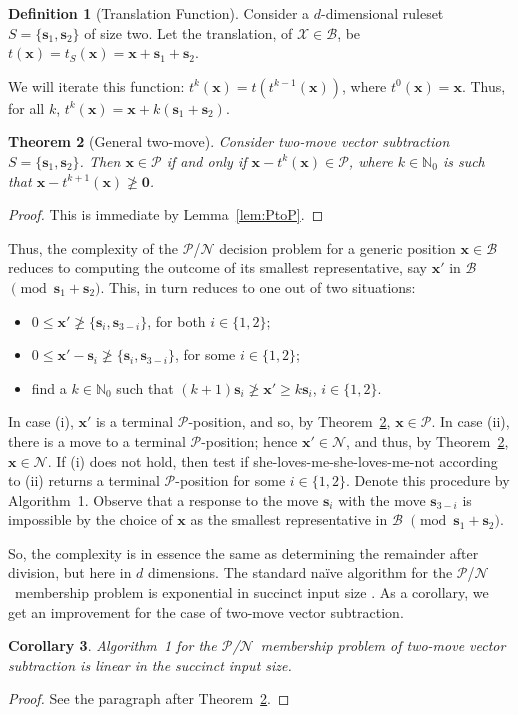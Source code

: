 \documentclass{amsart}
\theoremstyle{plain}
\newtheorem{thm}{Theorem}%
\newtheorem{cor}[thm]{Corollary}
\theoremstyle{definition}
\newtheorem{defi}[thm]{Definition}
\newcommand{\N}{\ensuremath{\mathcal N}}
\renewcommand{\P}{\ensuremath{\mathcal P}}
\newcommand{\B}{\mathcal B}
\newcommand{\X}{\mathcal X}
\newcommand{\nz}{\mathbb N_0}
\newcommand{\x}{\boldsymbol x}
\newcommand{\s}{\boldsymbol s}
\renewcommand{\ge}{\geqslant}
\renewcommand{\le}{\leqslant}
\renewcommand{\ngeq}{\ngeqslant}
\newcommand{\ur}[1]{\textcolor{red}{#1}}
\newcommand{\In}[1]{\textcolor{blue}{#1}}
\begin{document}
\begin{defi}[Translation Function]\label{def:trans}
    Consider a $d$-dimensional ruleset $S=\{\s_1 ,\s_2\}$ of size two. %
    Let the translation, of $\X\in \B$, be 
    $t(\x)=t_S(\x)=\x +\s_1+\s_2$.
\end{defi}
We will iterate this function: $t^k(\x)=t(t^{k-1}(\x))$, where $t^0(\x)=\x$. Thus, for all $k$, $t^k(\x) = \x +k(\s_1+\s_2)$. 
\begin{thm}[General {\sc two-move}]\label{thm:2mddim}
    Consider {\sc two-move vector subtraction} $S=\{\s_1,\s_2\}$. 
    Then $\x\in\P$ if and only if $\x-t^k(\x)\in\P$, where $k \in\nz$  is such that $\x-t^{k+1}(\x)\ngeq\boldsymbol 0$.
    
\end{thm}
\begin{proof}
This is immediate by Lemma~\ref{lem:PtoP}.
\end{proof}
Thus, the complexity of the $\P$/$\N$ decision problem for a generic position $\x\in\B$ reduces to computing the outcome of its smallest  representative, say $\x'$ in $\B$ $\pmod {\s_1+\s_2}$. This, in turn reduces to  one  out of two situations:
\begin{itemize}
\item[(i)] $0\le \x'\ngeq \{\s_i,\s_{3-i}\}$, for both $i\in\{1,2\}$;
\item[(ii)] $0\le \x'-\s_i\ngeq \{\s_i,\s_{3-i}\}$, for some $i\in\{1,2\}$;
\item[(iii)] find a $k\in\nz$ such that $(k+1)\s_i\ngeq\x'\ge k\s_i$, $i\in\{1,2\}$. 
\end{itemize}
In case (i), $\x'$ is a terminal \P-position, and so, by Theorem~\ref{thm:2mddim}, $\x\in\P$. 
In case (ii), there is a move to a terminal \P-position; hence $\x'\in \N$, and thus, by Theorem~\ref{thm:2mddim}, $\x\in \N$. If (i) does not hold, then test if she-loves-me-she-loves-me-not according to (ii) returns a terminal \P-position for some $i\in \{1,2\}$. Denote this procedure by Algorithm~1. Observe that a response to the move $\s_i$ with the move $\s_{3-i}$ is impossible by the choice of $\x$ as the smallest representative in $\B$ $\pmod {\s_1+\s_2}$. 


So, the complexity is in essence the same as determining the remainder after division, but here in $d$ dimensions. %
   The standard na\"ive algorithm for the \P/\N\ membership problem is exponential in succinct input size \cite{fraenkel2004complexity}. 
   As a corollary, we get an improvement for the case of {\sc two-move vector subtraction}. 
\begin{cor}
  Algorithm~1 for the \P/\N\   membership problem of {\sc two-move vector subtraction} is linear in the succinct input size.
\end{cor}
\begin{proof}

See the paragraph after Theorem~\ref{thm:2mddim}.
\end{proof}
\end{document}
